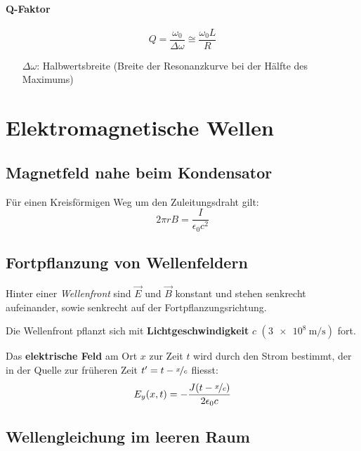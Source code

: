 		\paragraph{Q-Faktor} %
			\begin{equation*}
				Q = \frac{\omega_0}{\Delta \omega} \cong \frac{\omega_0 L}{R}
			\end{equation*}
			\begin{itemize}
				\item[$\Delta \omega$:] Halbwertsbreite (Breite der Resonanzkurve bei der Hälfte des Maximums)
			\end{itemize}
\section{Elektromagnetische Wellen} %
	\subsection{Magnetfeld nahe beim Kondensator} %
		Für einen Kreisförmigen Weg um den Zuleitungsdraht gilt:
		\begin{equation*}
			2\pi r B = \frac{I}{\epsilon_0 c^2}
		\end{equation*}
	\subsection{Fortpflanzung von Wellenfeldern} %
		Hinter einer \emph{Wellenfront} sind $\vec E$ und $\vec B$ konstant und
		stehen senkrecht aufeinander, sowie senkrecht auf der Fortpflanzungsrichtung.
		
		Die Wellenfront pflanzt sich mit \textbf{Lichtgeschwindigkeit} $c$ $(\SI{3e8}{\metre\per\second})$ fort.
		
		Das \textbf{elektrische Feld} am Ort $x$ zur Zeit $t$ wird durch den Strom
		bestimmt, der in der Quelle zur früheren Zeit $t' = t - \nicefrac x c$ fliesst:
		\begin{equation*}
			E_y(x,t) = - \frac{J(t-\nicefrac x c)}{2\epsilon_0 c}
		\end{equation*}
	\subsection{Wellengleichung im leeren Raum} %
